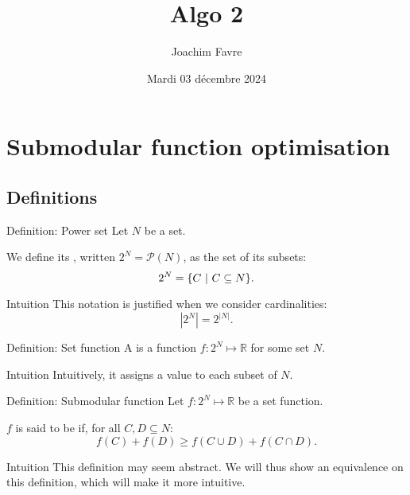 \documentclass[a4paper]{article}
\title{Algo 2}
\author{Joachim Favre}
\date{Mardi 03 décembre 2024}
\begin{document}
\maketitle


\section{Submodular function optimisation}

\subsection{Definitions}

\begin{parag}{Definition: Power set}
    Let $N$ be a set.

    We define its , written $2^N = \mathcal{P}\left(N\right)$, as the set of its subsets: 
    \[2^N = \left\{C \suchthat C \subseteq N\right\}.\]

    \begin{subparag}{Intuition}
        This notation is justified when we consider cardinalities: 
        \[\left|2^N\right| = 2^{\left|N\right|}.\]
    \end{subparag}
\end{parag}

\begin{parag}{Definition: Set function}
    A  is a function $f: 2^N \mapsto \mathbb{R}$ for some set $N$. 

    \begin{subparag}{Intuition}
        Intuitively, it assigns a value to each subset of $N$.
    \end{subparag}
\end{parag}

\begin{parag}{Definition: Submodular function}
    Let $f: 2^N \mapsto \mathbb{R}$ be a set function.
    
    $f$ is said to be  if, for all $C, D \subseteq N$: 
    \[f\left(C\right) + f\left(D\right) \geq f\left(C \cup D\right) + f\left(C \cap D\right).\]

    \begin{subparag}{Intuition}
        This definition may seem abstract. We will thus show an equivalence on this definition, which will make it more intuitive.
    \end{subparag}
\end{parag}
\end{document}
